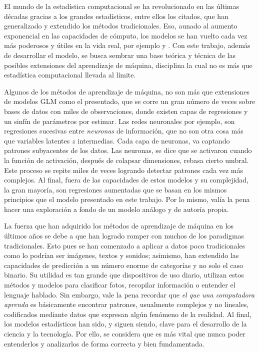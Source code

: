 \documentclass[../Main/Main.tex]{subfiles}
\begin{document}
El mundo de la estadística computacional se ha revolucionado en las últimas décadas gracias a los grandes estadísticos, entre ellos los citados, que han generalizado y extendido los métodos tradicionales. Eso, aunado al aumento exponencial en las capacidades de cómputo, los modelos se han vuelto cada vez más poderosos y útiles en la vida real, por ejemplo \citet{madan2015automated} y \citet{shah2014bayesian}. Con este trabajo, además de desarrollar el modelo, se busca sembrar una base teórica y técnica de las posibles extensiones del aprendizaje de máquina, disciplina la cual no es más que estadística computacional llevada al límite.

Algunos de los métodos de aprendizaje de máquina, no son más que extensiones de modelos GLM como el presentado, que se corre un gran número de veces sobre bases de datos con miles de observaciones, donde existen capas de regresiones y un sinfín de parámetros por estimar. Las redes neuronales por ejemplo, son regresiones sucesivas entre \textit{neuronas} de información, que no son otra cosa más que variables latentes $z$ intermedias. Cada capa de neuronas, va captando patrones subyacentes de los datos. Las neuronas, se dice que se activaron cuando la función de activación, después de colapsar dimensiones, rebasa cierto umbral. Este proceso se repite miles de veces logrando detectar patrones cada vez más complejos. Al final, fuera de las capacidades de estos modelos y su complejidad, la gran mayoría, son regresiones aumentadas que se basan en los mismos principios que el modelo presentado en este trabajo. Por lo mismo, valía la pena hacer una exploración a fondo de un modelo análogo y de autoría propia. 

La fuerza que han adquirido los métodos de aprendizaje de máquina en los últimos años se debe a que han logrado romper con muchos de los paradigmas tradicionales. Esto pues se han comenzado a aplicar a datos poco tradicionales como lo podrían ser imágenes, textos y sonidos; asimismo, han extendido las capacidades de predicción a un número enorme de categorías y no solo el caso binario. Su utilidad es tan grande que dispositivos de uso diario, utilizan estos métodos y modelos para clasificar fotos, recopilar información o entender el lenguaje hablado. Sin embargo, vale la pena recordar que \textit{el que una computadora aprenda} es básicamente encontrar patrones, usualmente complejos y no lineales, codificados mediante datos que expresan algún fenómeno de la realidad. Al final, los modelos estadísticos han sido, y siguen siendo, clave para el desarrollo de la ciencia y la tecnología. Por ello, se considera que es más vital que nunca poder entenderlos y analizarlos de forma correcta y bien fundamentada. 
\end{document}
